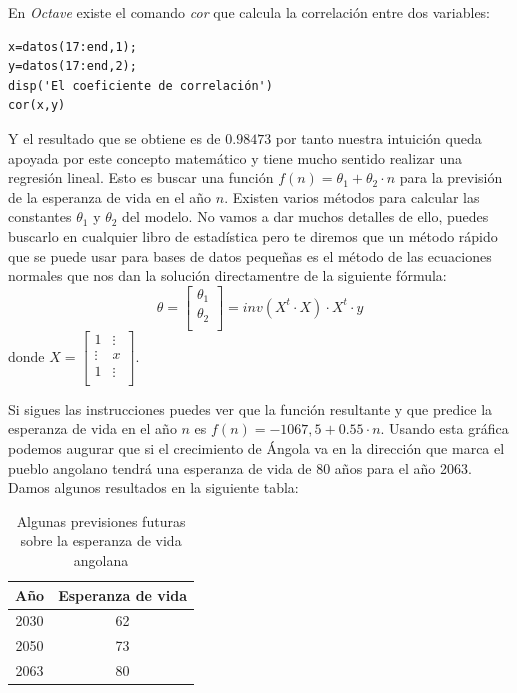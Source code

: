 En \emph{Octave} existe el comando \emph{cor} que calcula la
correlación entre dos variables:
\begin{octavebox}
  \begin{verbatim}
x=datos(17:end,1);
y=datos(17:end,2);
disp('El coeficiente de correlación')
cor(x,y)
\end{verbatim}
\end{octavebox}
Y el resultado que se obtiene es de $0.98473$ por tanto nuestra
intuición queda apoyada por este concepto matemático y tiene mucho
sentido realizar una regresión lineal. Esto es buscar una función
$f(n)=\theta_1+\theta_2 \cdot n$ para la previsión de la esperanza de
vida en el año $n$.  Existen varios métodos para calcular las
constantes $\theta_1$ y $\theta_2$ del modelo. No vamos a dar muchos
detalles de ello, puedes buscarlo en cualquier libro de estadística
pero te diremos que un método rápido que se puede usar para bases de
datos pequeñas es el método de las ecuaciones normales que nos dan la
solución directamentre de la siguiente fórmula:
\begin{equation}
\theta=\left[
\begin{array}{c}
\theta_1\\
\theta_2\\
\end{array}
\right]=inv(X^t \cdot X)\cdot X^t \cdot y
\end{equation}
donde $X=\left[
\begin{array}{cc}
1 & \vdots\\
\vdots & x\\
1 & \vdots\\
\end{array}
\right]$.

Si sigues las instrucciones puedes ver que la función resultante y que
predice la esperanza de vida en el año $n$ es $f(n)=-1067,5+0.55 \cdot n$.  Usando esta
gráfica podemos augurar que si el crecimiento de Ángola va en la
dirección que marca el pueblo angolano tendrá una esperanza de vida de
80 años para el año 2063.  Damos algunos resultados en la siguiente tabla:
\begin{table}
\begin{center}
\begin{tabular}{cc}
\hline
Año & Esperanza de vida\\
\hline
2030 & 62\\
2050 & 73\\
2063 & 80\\
\hline
\end{tabular}
\end{center}\caption{Algunas previsiones futuras sobre la esperanza de vida angolana}
\end{table}







\newpage



